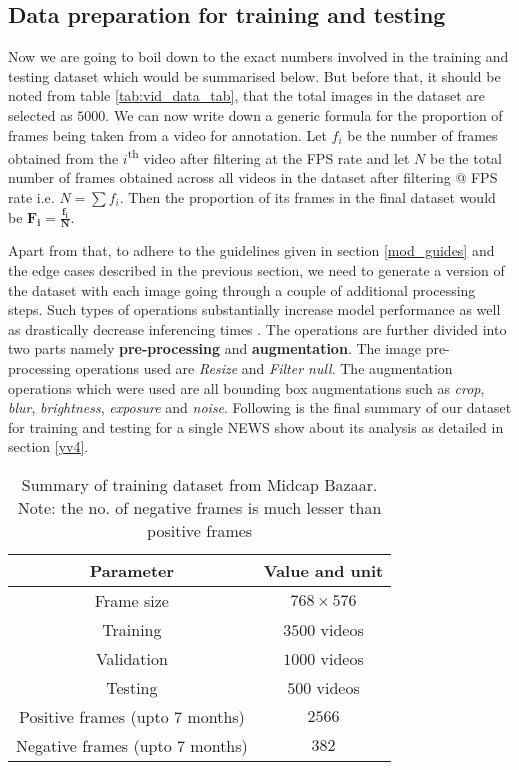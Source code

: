 \subsection{Data preparation for training and testing} \label{train_test}
Now we are going to boil down to the exact numbers involved in the training and testing dataset which would be summarised below. But before that, it should be noted from table \ref{tab:vid_data_tab}, that the total images in the dataset are selected as $5000$. We can now write down a generic formula for the proportion of frames being taken from a video for annotation. Let $f_i$ be the number of frames obtained from the $i$\textsuperscript{th} video after filtering at the FPS rate and let $N$ be the total number of frames obtained across all videos in the dataset after filtering @ FPS rate i.e. $N = \sum f_{i}$. Then the proportion of its frames in the final dataset would be $\boldsymbol{F_{i} = \frac{f_{i}}{N}}$. \par

Apart from that, to adhere to the guidelines given in section \ref{mod_guides} and the edge cases described in the previous section, we need to generate a version of the dataset with each image going through a couple of additional processing steps. Such types of operations substantially increase model performance as well as drastically decrease inferencing times \cite{Joseph2021} \cite{Dwyer2020}. The operations are further divided into two parts namely \textbf{pre-processing} and \textbf{augmentation}.  The image pre-processing operations used are \textit{Resize} and \textit{Filter null}. The augmentation operations which were used are all bounding box augmentations such as \textit{crop}, \textit{blur}, \textit{brightness}, \textit{exposure} and \textit{noise}. Following is the final summary of our dataset for training and testing for a single NEWS show about its analysis as detailed in section \ref{yv4}.

\begin{table}[h]
 \def\arraystretch{1.5}
 \centering
 \caption{Summary of training dataset from Midcap Bazaar. Note: the no. of negative frames is much lesser than positive frames}
 \begin{tabular}{|c|c|}
  \hline
  Parameter & Value and unit \\
  \hline
  Frame size & $768 \times 576$                    \\
  \hline
  Training & $3500$ videos                   \\
  \hline
  Validation & $1000$ videos                 \\
  \hline
  Testing & $500$ videos                   \\
  \hline
  Positive frames (upto $7$ months) & $2566$                   \\
  \hline
  Negative frames (upto $7$ months) & $382$                   \\
  \hline
 \end{tabular}
 \label{tab:vid_train}
\end{table}

